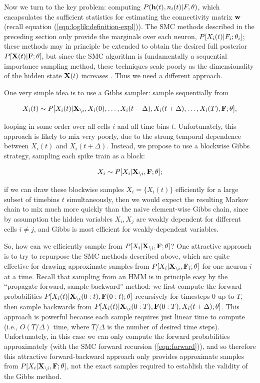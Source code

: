 Now we turn to the key problem: computing $P(\mathbf{h}(t),n_i(t) | F,\theta)$, which encapsulates the sufficient statistics for estimating the connectivity matrix $\mathbf{w}$ (recall equation (\ref{eqn:loglik:definition-expl})). The SMC methods described in the preceding section only provide the marginals over each neuron, $P[X_i(t) | F_i; \mathbf{\theta}_i]$; these methods may in principle be extended to obtain the desired full posterior $P[{\bf X}(t) | {\bf F}; \mathbf{\theta}]$, but since the SMC algorithm is fundamentally a sequential importance sampling method, these techniques scale poorly as the dimensionality of the hidden state ${\bf X}(t)$ increases \cite{BickelBengtsson08}. Thus we need a different approach.

One very simple idea is to use a Gibbs sampler: sample sequentially
from

\begin{align}
X_i(t) \sim P[X_i(t) | \bX_{\i}, X_i(0), \ldots, X_i(t-\Delta),
 X_i(t+\Delta), \ldots, X_i(T), \bF; \bth],
\end{align} 

looping in some order over all cells $i$ and all time bins $t$.
Unfortunately, this approach is likely to mix very poorly, due to the
strong temporal dependence between $X_i(t)$ and $X_i(t+\Delta)$.
Instead, we propose to use a blockwise Gibbs strategy, sampling each
spike train as a block:

\begin{align}
	X_i \sim P[X_i | \bX_{\i}, \bF; \bth];
\end{align} 

if we can draw these blockwise samples $X_i = \{X_i(t)\}$ efficiently for a large subset of timebins $t$ simultaneously, then we would expect the resulting Markov chain to mix much more quickly than the naive element-wise Gibbs chain, since by assumption the hidden variables $X_i,X_j$ are weakly dependent for different cells $i \neq j$, and Gibbs is most efficient for weakly-dependent variables.

So, how can we efficiently sample from $P[X_i | {\bf X}_{\backslash i}, {\bf F}; \mathbf{\theta}]$? One attractive approach is to try to repurpose the SMC methods described above, which are quite effective for drawing approximate samples from $P[X_i | {\bf X}_{\backslash i}, {\bf F}_i; \mathbf{\theta}]$ for one neuron $i$ at a time. Recall that sampling from an HMM is in principle easy by the ``propagate forward, sample backward'' method: we first compute the forward probabilities $P[X_i(t) | {\bf X}_{\backslash i}(0:t), {\bf F}(0:t); \mathbf{\theta}]$ recursively for timesteps $0$ up to $T$, then sample backwards from $P[X_i(t) | {\bf X}_{\backslash i}(0:T), {\bf F}(0:T), X_i(t+\Delta); \mathbf{\theta}]$. This approach is powerful because each sample requires just linear time to compute (i.e., $O(T/\Delta)$ time, where $T/\Delta$ is the number of desired time steps). Unfortunately, in this case we can only compute the forward probabilities approximately (with the SMC forward recursion (\ref{eqn:forward})), and so therefore this attractive forward-backward approach only provides approximate samples from $P[X_i | {\bf X}_{\backslash i}, {\bf F}; \mathbf{\theta}]$, not the exact samples required to establish the validity of the Gibbs method.

